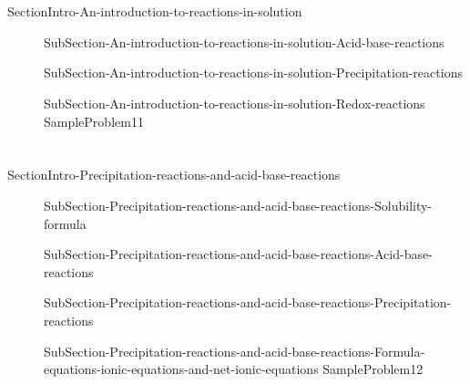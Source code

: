\documentclass[main.tex]{subfiles} %
\newcommand\chapterlabel{Ch-electrolytes}\setcounter{figurenewcounter}{0}\setcounter{tablenewcounter}{0}\setcounter{formulanewcounter}{0}
\begin{document}
\section{\color{blue!30!black}{An introduction to reactions in solution}}
{SectionIntro-An-introduction-to-reactions-in-solution}
\sloppy \begin{description}
\item[] {SubSection-An-introduction-to-reactions-in-solution-Acid-base-reactions}
\item[]{SubSection-An-introduction-to-reactions-in-solution-Precipitation-reactions}
\item[]{SubSection-An-introduction-to-reactions-in-solution-Redox-reactions}
{SampleProblem11}
\end{description}

\section{\color{blue!30!black}{Precipitation reactions and acid-base reactions}}
{SectionIntro-Precipitation-reactions-and-acid-base-reactions}
\sloppy \begin{description}
\item[] {SubSection-Precipitation-reactions-and-acid-base-reactions-Solubility-formula}
\item[]{SubSection-Precipitation-reactions-and-acid-base-reactions-Acid-base-reactions}
\item[] {SubSection-Precipitation-reactions-and-acid-base-reactions-Precipitation-reactions}
\item[]{SubSection-Precipitation-reactions-and-acid-base-reactions-Formula-equations-ionic-equations-and-net-ionic-equations}
{SampleProblem12}
\end{description}
\end{document}

